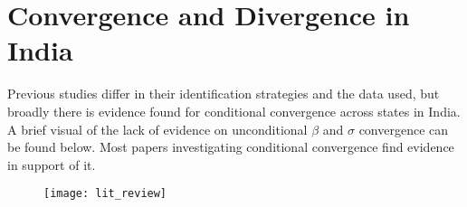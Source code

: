 \documentclass[a4paper, 11pt]{article}
\begin{document}
\section{Convergence and Divergence in India}

Previous studies differ in their identification strategies and the data used, but broadly there is evidence found for conditional convergence across states in India.  A brief visual of the lack of evidence on unconditional $\beta$ and $\sigma$ convergence can be found below.  Most papers investigating conditional convergence find evidence in support of it.\par

\begin{figure}[h]
\texttt{[image: lit\_review]}
\caption{\citep{cherodian_regional_2015}}
\end{figure}
\end{document}
